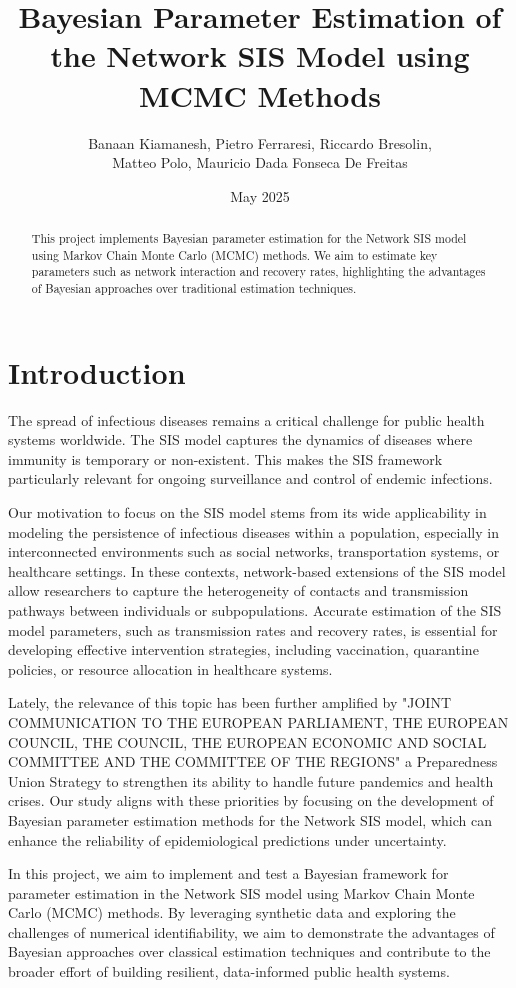 \documentclass[a4paper,10pt]{report}
\title{Bayesian Parameter Estimation of the Network SIS Model using MCMC Methods}
\author{ Banaan Kiamanesh, Pietro Ferraresi, Riccardo Bresolin,\\ Matteo Polo, 
Mauricio Dada Fonseca De Freitas}
\date{May 2025}
\begin{document}
\maketitle

\begin{abstract}
This project implements Bayesian parameter estimation for the Network SIS model using Markov Chain Monte Carlo (MCMC) methods. We aim to estimate key parameters such as network interaction and recovery rates, highlighting the advantages of Bayesian approaches over traditional estimation techniques.
\end{abstract}

\section{Introduction}

The spread of infectious diseases remains a critical challenge for public health systems worldwide. The SIS model captures the dynamics of diseases where immunity is temporary or non-existent. This makes the SIS framework particularly relevant for ongoing surveillance and control of endemic infections.

Our motivation to focus on the SIS model stems from its wide applicability in modeling the persistence of infectious diseases within a population, especially in interconnected environments such as social networks, transportation systems, or healthcare settings. In these contexts, network-based extensions of the SIS model allow researchers to capture the heterogeneity of contacts and transmission pathways between individuals or subpopulations. Accurate estimation of the SIS model parameters, such as transmission rates and recovery rates, is essential for developing effective intervention strategies, including vaccination, quarantine policies, or resource allocation in healthcare systems.

Lately, the relevance of this topic has been further amplified by "JOINT COMMUNICATION TO THE EUROPEAN PARLIAMENT, THE 
EUROPEAN COUNCIL, THE COUNCIL, THE EUROPEAN ECONOMIC AND 
SOCIAL COMMITTEE AND THE COMMITTEE OF THE REGIONS" a Preparedness Union Strategy to strengthen its ability to handle future pandemics and health crises. Our study aligns with these priorities by focusing on the development of Bayesian parameter estimation methods for the Network SIS model, which can enhance the reliability of epidemiological predictions under uncertainty.

In this project, we aim to implement and test a Bayesian framework for parameter estimation in the Network SIS model using Markov Chain Monte Carlo (MCMC) methods. By leveraging synthetic data and exploring the challenges of numerical identifiability, we aim to demonstrate the advantages of Bayesian approaches over classical estimation techniques and contribute to the broader effort of building resilient, data-informed public health systems.
\end{document}
